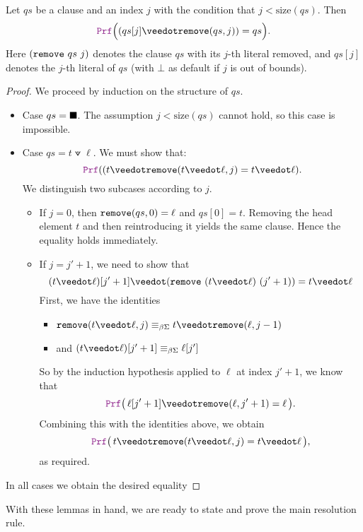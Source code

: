 \begin{lemma}\label{lem:orN_remove}
Let $qs$ be a clause and an index $j$ with the condition that $j < \mathrm{size}(qs)$. Then
\[
  \prf\Bigl((qs[j] \veedot \kw{remove}(qs,j)) = qs\Bigr).
\]
Here $(\texttt{\upshape{remove}}~qs~j)$ denotes the clause $qs$ with its $j$-th literal removed, and
$qs[j]$ denotes the $j$-th literal of $qs$ (with $\bot$ as default if $j$ is out of bounds).
\begin{proof}
We proceed by induction on the structure of $qs$.

\begin{itemize}
  \item[] Case $qs=\blacksquare$.  The assumption $j < \mathrm{size}(qs)$ cannot hold, so this case is impossible.

  \item[] Case $qs= t \veedot \ell$. We must show that:
  \[
    \prf((t \veedot \kw{remove}(t \veedot \ell,j) = t \veedot \ell).
  \]
  We distinguish two subcases according to $j$.
  \begin{itemize}
    \item If $j=0$, then $\texttt{\upshape{remove}}(qs,0)=\ell$ and $qs[0]=t$.
    Removing the head element $t$ and then reintroducing it yields the same clause.
    Hence the equality holds immediately.
    \item If $j = j' +1$, we need to show that
      \[
          (t \veedot \ell)[j'+1] \veedot (\kw{remove}~(t \veedot \ell)~(j'+1)) = t \veedot \ell
      \]
      First, we have the identities
      \begin{itemize}
        \item[] $\kw{remove}(t \veedot \ell,j) \equivL t \veedot \kw{remove}(\ell,j-1)$
        \item[] and $(t \veedot \ell)[j'+1] \equivL \ell[j']$
      \end{itemize}
      So by the induction hypothesis applied to $\ell$ at index $j'+1$, we know that
      \[
        \prf\bigl(\,\ell[j'+1] \veedot \kw{remove}(\ell,j'+1) = \ell\,\bigr).
      \]
      Combining this with the identities above, we obtain
      \[
        \prf\bigl(\,t \veedot \kw{remove}(t \veedot \ell,j) = t \veedot \ell\,\bigr),
      \]
      as required.
  \end{itemize}
\end{itemize}
In all cases we obtain the desired equality
\end{proof}
\end{lemma}

With these lemmas in hand, we are ready to state and prove the main resolution rule.

